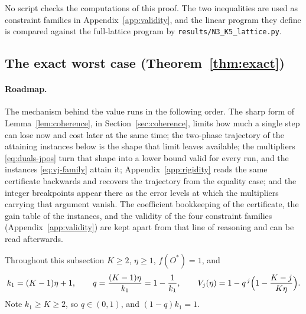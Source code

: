 No script checks the computations of this proof.  The two inequalities are
used as constraint families in Appendix~\ref{app:validity}, and the linear
program they define is compared against the full-lattice program by
\texttt{results/N3\_K5\_lattice.py}.

\subsection{The exact worst case (Theorem~\ref{thm:exact})}\label{app:exact}

\paragraph{Roadmap.}
The mechanism behind the value runs in the following order.  The sharp form of
Lemma~\ref{lem:coherence}, in Section~\ref{sec:coherence}, limits how much a
single step can lose now and cost later at the same time; the two-phase
trajectory of the attaining instances below is the shape that limit leaves
available; the multipliers \eqref{eq:duals-jpos} turn that shape into a lower
bound valid for every run, and the instances \eqref{eq:vj-family} attain it;
Appendix~\ref{app:rigidity} reads the same certificate backwards and recovers
the trajectory from the equality case; and the integer breakpoints appear
there as the error levels at which the multipliers carrying that argument
vanish.  The coefficient bookkeeping of the certificate, the gain table of the
instances, and the validity of the four constraint families
(Appendix~\ref{app:validity}) are kept apart from that line of reasoning and
can be read afterwards.

Throughout this subsection $K\ge2$, $\eta\ge1$, $f(O^{\ast})=1$, and
\[
  k_1=(K-1)\eta+1,\qquad q=\frac{(K-1)\eta}{k_1}=1-\frac1{k_1},\qquad
  V_j(\eta)=1-q^{\,j}\Bigl(1-\frac{K-j}{K\eta}\Bigr).
\]
Note $k_1\ge K\ge2$, so $q\in(0,1)$, and $(1-q)k_1=1$.

